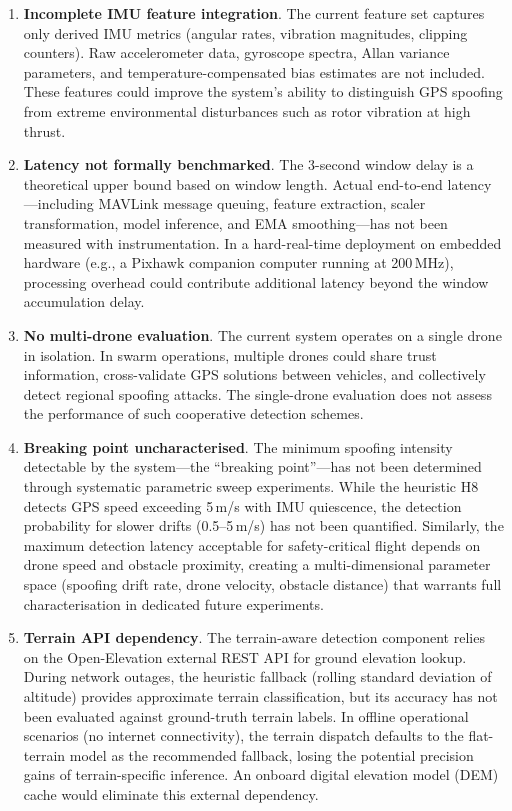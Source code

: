 \begin{enumerate}
    \item \textbf{Incomplete IMU feature integration}. The current feature set captures only derived IMU metrics (angular rates, vibration magnitudes, clipping counters). Raw accelerometer data, gyroscope spectra, Allan variance parameters, and temperature-compensated bias estimates are not included. These features could improve the system's ability to distinguish GPS spoofing from extreme environmental disturbances such as rotor vibration at high thrust.
    \item \textbf{Latency not formally benchmarked}. The 3-second window delay is a theoretical upper bound based on window length. Actual end-to-end latency---including MAVLink message queuing, feature extraction, scaler transformation, model inference, and EMA smoothing---has not been measured with instrumentation. In a hard-real-time deployment on embedded hardware (e.g., a Pixhawk companion computer running at 200\,MHz), processing overhead could contribute additional latency beyond the window accumulation delay.
    \item \textbf{No multi-drone evaluation}. The current system operates on a single drone in isolation. In swarm operations, multiple drones could share trust information, cross-validate GPS solutions between vehicles, and collectively detect regional spoofing attacks. The single-drone evaluation does not assess the performance of such cooperative detection schemes.
    \item \textbf{Breaking point uncharacterised}. The minimum spoofing intensity detectable by the system---the ``breaking point''---has not been determined through systematic parametric sweep experiments. While the heuristic H8 detects GPS speed exceeding 5\,m/s with IMU quiescence, the detection probability for slower drifts (0.5--5\,m/s) has not been quantified. Similarly, the maximum detection latency acceptable for safety-critical flight depends on drone speed and obstacle proximity, creating a multi-dimensional parameter space (spoofing drift rate, drone velocity, obstacle distance) that warrants full characterisation in dedicated future experiments.
    \item \textbf{Terrain API dependency}. The terrain-aware detection component relies on the Open-Elevation external REST API for ground elevation lookup. During network outages, the heuristic fallback (rolling standard deviation of altitude) provides approximate terrain classification, but its accuracy has not been evaluated against ground-truth terrain labels. In offline operational scenarios (no internet connectivity), the terrain dispatch defaults to the flat-terrain model as the recommended fallback, losing the potential precision gains of terrain-specific inference. An onboard digital elevation model (DEM) cache would eliminate this external dependency.
\end{enumerate}

